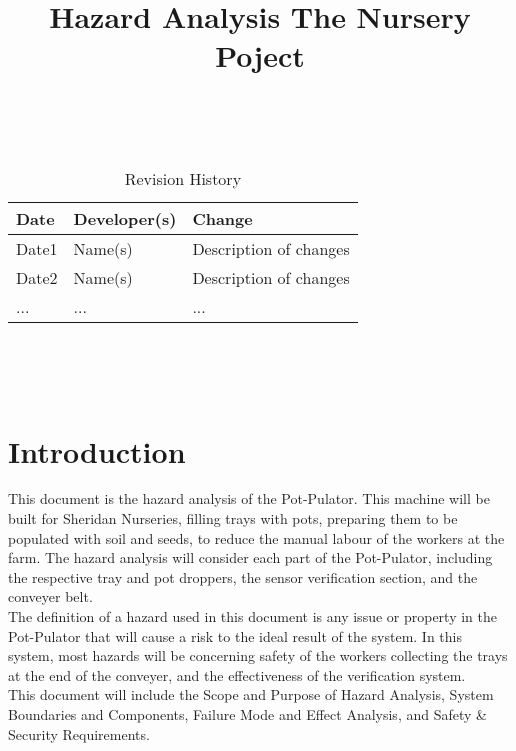 \documentclass{article}
\title{Hazard Analysis The Nursery Poject}
\author{\authname}
\date{}
\begin{document}
\maketitle
\thispagestyle{empty}

~\newpage


\begin{table}[hp]
\caption{Revision History} \label{TblRevisionHistory}
\begin{tabularx}{\textwidth}{llX}
\toprule
\textbf{Date} & \textbf{Developer(s)} & \textbf{Change}\\
\midrule
Date1 & Name(s) & Description of changes\\
Date2 & Name(s) & Description of changes\\
... & ... & ...\\
\bottomrule
\end{tabularx}
\end{table}

~\newpage

\tableofcontents

~\newpage


\section{Introduction}

\noindent This document is the hazard analysis of the Pot-Pulator. This machine will be built for Sheridan Nurseries, filling trays with pots, preparing them to be populated with soil and seeds, to reduce the manual labour of the workers at the farm. The hazard analysis will consider each part of the Pot-Pulator, including the respective tray and pot droppers, the sensor verification section, and the conveyer belt. 
\\

\noindent The definition of a hazard used in this document is any issue or property in the Pot-Pulator that will cause a risk to the ideal result of the system. In this system, most hazards will be concerning safety of the workers collecting the trays at the end of the conveyer, and the effectiveness of the verification system. 
\\

\noindent This document will include the Scope and Purpose of Hazard Analysis, System Boundaries and Components, Failure Mode and Effect Analysis, and Safety \& Security Requirements.  
\end{document}
